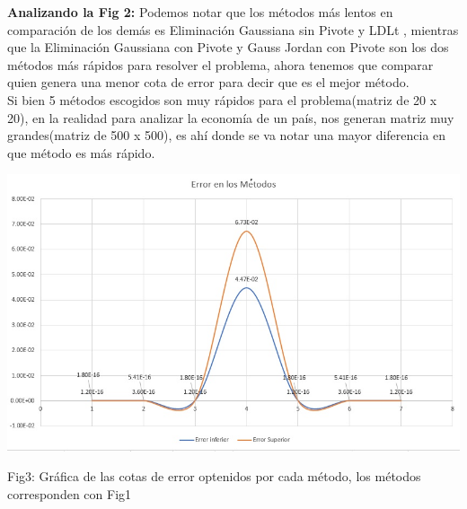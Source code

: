 \documentclass[10pt,a4paper]{article}
\begin{document}
\begin{multicols}{2}
\noindent \textbf{Analizando la Fig 2:} 
Podemos notar que los métodos más lentos en comparación de los demás es Eliminación Gaussiana sin Pivote y LDLt , mientras que la Eliminación Gaussiana con Pivote y Gauss Jordan con Pivote son los dos métodos más rápidos para resolver el problema, ahora tenemos que comparar quien genera una menor cota de error para decir que es el mejor método.\\
\noindent Si bien 5 métodos escogidos son muy rápidos para el problema(matriz de 20 x 20), en la realidad para analizar la economía de un país, nos generan matriz muy grandes(matriz de 500 x 500), es ahí donde se va notar una mayor diferencia en que método es más rápido.
\end{multicols}

\begin{center}
	\centering
\includegraphics[scale=0.6]{Errorenlosmetodos.jpg}
	
	Fig3: Gráfica de las cotas de error optenidos por cada método, los métodos corresponden con Fig1
\end{center}
\end{document}
